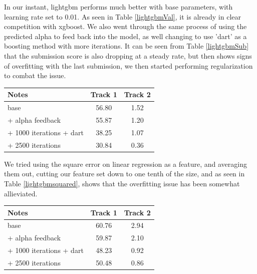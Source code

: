 \documentclass[a4paper, 12pt]{article}
\begin{document}
\begin{multicols}{2}
                    In our instant, lightgbm performs much better with base parameters, with learning rate set to 0.01. As seen in Table \ref{lightgbmVal}, it is already in clear competition with xgboost. We also went through the same process of using the predicted alpha to feed back into the model, as well changing to use 'dart' as a boosting method with more iterations. It can be seen from Table \ref{lightgbmSub} that the submission score is also dropping at a steady rate, but then shows signs of overfitting with the last submission, we then started performing regularization to combat the issue.

                    \begin{center}
                        \begin{tabular}{l|cc}
                            Notes & Track 1 & Track 2\\
                            \hline
                            base & 56.80 & 1.52 \\
                            + alpha feedback & 55.87 & 1.20 \\
                            + 1000 iterations + dart & 38.25  & 1.07 \\
                            + 2500 iterations & 30.84 & 0.36 \\
                        \end{tabular}
                        \label{lightgbmVal}
                    \end{center}

                    We tried using the square error on linear regression as a feature, and averaging them out, cutting our feature set down to one tenth of the size, and as seen in Table \ref{lightgbmsquared}, shows that the overfitting issue has been somewhat allieviated.

                    \begin{center}
                        \begin{tabular}{l|cc}
                            Notes & Track 1 & Track 2\\
                            \hline
                            base & 60.76 & 2.94 \\
                            + alpha feedback & 59.87 & 2.10 \\
                            + 1000 iterations + dart & 48.23 & 0.92 \\
                            + 2500 iterations & 50.48 & 0.86 \\
                        \end{tabular}
                        \label{lightgbmSub}
                    \end{center}


\end{multicols}
\end{document}
